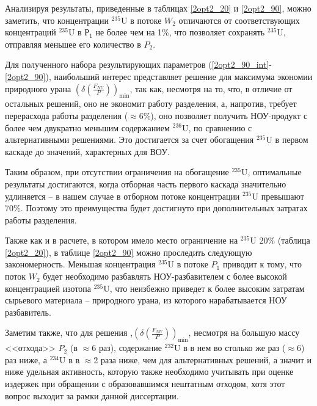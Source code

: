 Анализируя результаты, приведенные в таблицах \ref{2opt2_20} и \ref{2opt2_90}, можно заметить, что концентрации $^{235}$U в потоке $W_2$ отличаются от соответствующих концентраций $^{235}$U в $Р_1$ не более чем на 1\%, что позволяет сохранять $^{235}$U, отправляя меньшее его количество в $P_2$.

Для полученного набора результирующих параметров (\ref{2opt2_90_int}-\ref{2opt2_90}), наибольший интерес представляет решение для максимума экономии природного урана $(\delta(\frac{F_{NU}}{P}))_\text{min}$, так как, несмотря на то, что, в отличие от остальных решений, оно не экономит работу разделения, а, напротив, требует перерасхода работы разделения ($\approx$6\%), оно позволяет получить НОУ-продукт с более чем двукратно меньшим содержанием $^{236}$U, по сравнению с альтернативными решениями. Это достигается за счет обогащения $^{235}$U в первом каскаде до значений, характерных для ВОУ.

Таким образом, при отсутствии ограничения на обогащение $^{235}$U, оптимальные результаты достигаются, когда отборная часть первого каскада значительно удлиняется -- в нашем случае в отборном потоке концентрации $^{235}$U превышают 70\%. Поэтому это преимущества будет достигнуто при дополнительных затратах работы разделения.

Также как и в расчете, в котором имело место ограничение на $^{235}$U 20\% (таблица \ref{2opt2_20}), в таблице \ref{2opt2_90} можно проследить следующую закономерность. Меньшая концентрация $^{235}$U в потоке $P_{1}$ приводит к тому, что поток $W_{2}$ будет необходимо разбавлять НОУ-разбавителем с более высокой концентрацией изотопа $^{235}$U, что неизбежно приведет к более высоким затратам сырьевого материала -- природного урана, из которого нарабатывается НОУ разбавитель.

Заметим также, что для решения ,$(\delta(\frac{F_{NU}}{P}))_\text{min}$, несмотря на большую массу <<отхода>> $P_{2}$ (в $\approx$6 раз), содержание $^{232}$U в в нем во столько же раз ($\approx$6) раз ниже, а $^{234}$U в в $\approx$2 раза ниже, чем для альтернативных решений, а значит и ниже удельная активность, которую также необходимо учитывать при оценке издержек при обращении с образовавшимся нештатным отходом, хотя этот вопрос выходит за рамки данной диссертации.

